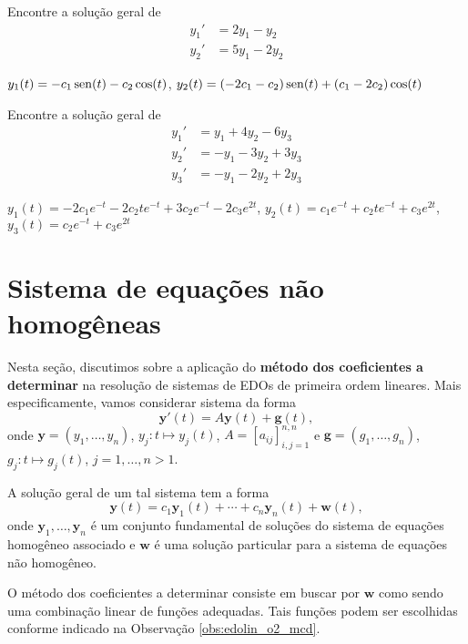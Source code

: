 \begin{exer}
  Encontre a solução geral de
  \begin{align}
    y_1' &= 2y_1 - y_2 \\
    y_2' &= 5y_1 - 2y_2
  \end{align}
\end{exer}
\begin{resp}
  $y_1(t) = -c_1\operatorname{sen}(t) - c_2\cos(t)$, $y_2(t) = (-2c_1-c_2)\operatorname{sen}(t) + (c_1 -2c_2)\cos(t)$
\end{resp}

\begin{exer}
  Encontre a solução geral de
  \begin{align}
    y_1' &= y_1 + 4y_2 - 6y_3 \\
    y_2' &= -y_1 -3y_2 + 3y_3 \\
    y_3' &= -y_1 -2y_2 + 2y_3
  \end{align}
\end{exer}
\begin{resp}
  $y_1(t) = -2c_1e^{-t}-2c_2te^{-t}+3c_2e^{-t}-2c_3e^{2t}$, $y_2(t)=c_1e^{-t}+c_2te^{-t}+c_3e^{2t}$, $y_3(t) = c_2e^{-t}+c_3e^{2t}$
\end{resp}


\section{Sistema de equações não homogêneas}\label{cap_edosis1_sec_eqnh}

Nesta seção, discutimos sobre a aplicação do {\bf método dos coeficientes a determinar} na resolução de sistemas de EDOs de primeira ordem lineares. Mais especificamente, vamos considerar sistema da forma
\begin{equation}
  \pmb{y}'(t) = A\pmb{y}(t) + \pmb{g}(t),
\end{equation}
onde $\pmb{y} = (y_1, \dotsc, y_n)$, $y_j:t\mapsto y_j(t)$, $A = [a_{ij}]_{i,j=1}^{n,n}$ e $\pmb{g} = (g_1, \dotsc, g_n)$, $g_j:t\mapsto g_j(t)$, $j=1, \dotsc, n>1$.

A solução geral de um tal sistema tem a forma
\begin{equation}
  \pmb{y}(t) = c_1\pmb{y}_1(t) + \cdots + c_n\pmb{y}_n(t) + \pmb{w}(t),
\end{equation}
onde $\pmb{y}_1, \dotsc, \pmb{y}_n$ é um conjunto fundamental de soluções do sistema de equações homogêneo associado e $\pmb{w}$ é uma solução particular para a sistema de equações não homogêneo.

O método dos coeficientes a determinar consiste em buscar por $\pmb{w}$ como sendo uma combinação linear de funções adequadas. Tais funções podem ser escolhidas conforme indicado na Observação \ref{obs:edolin_o2_mcd}.

